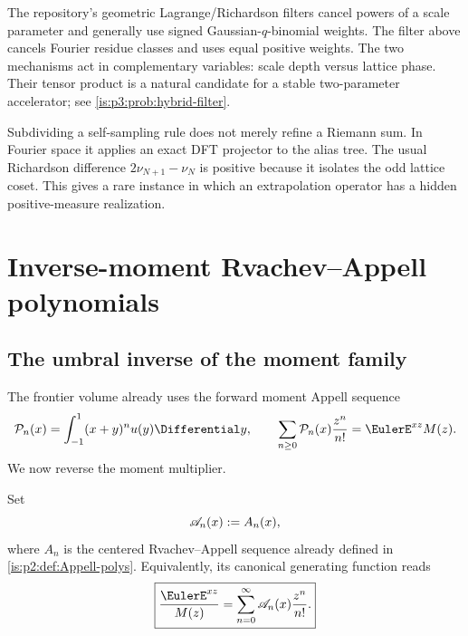 \begin{remark}
The repository's geometric Lagrange/Richardson filters cancel powers of a scale parameter and generally use signed Gaussian-$q$-binomial weights.  The filter above cancels Fourier residue classes and uses equal positive weights.  The two mechanisms act in complementary variables: scale depth versus lattice phase.  Their tensor product is a natural candidate for a stable two-parameter accelerator; see \cref{is:p3:prob:hybrid-filter}.
\end{remark}

\begin{resultbox}
Subdividing a self-sampling rule does not merely refine a Riemann sum.  In Fourier space it applies an exact DFT projector to the alias tree.  The usual Richardson difference $2\nu_{N+1}-\nu_N$ is positive because it isolates the odd lattice coset.  This gives a rare instance in which an extrapolation operator has a hidden positive-measure realization.
\end{resultbox}

\section{Inverse-moment Rvachev--Appell polynomials}
\label{is:p3:sec:appell}

\subsection{The umbral inverse of the moment family}

The frontier volume already uses the forward moment Appell sequence
\begin{equation}
 \Pcal_n(x)=\int_{-1}^{1}(x+y)^n u(y)\Differential y,
 \qquad
 \sum_{n\ge0}\Pcal_n(x)\frac{z^n}{n!}=\EulerE^{xz}M(z).
 \label{is:p3:eq:forward-Appell}
\end{equation}
We now reverse the moment multiplier.

\begin{definition}
\label{is:p3:def:inverse-Appell}
Set
\[
 \mathscr A_n(x):=A_n(x),
\]
where $A_n$ is the centered Rvachev--Appell sequence already defined in
\cref{is:p2:def:Appell-polys}.  Equivalently, its canonical generating
function reads
\begin{equation}
 \boxed{\displaystyle
 \frac{\EulerE^{xz}}{M(z)}
 =\sum_{n=0}^{\infty}\Acal_n(x)\frac{z^n}{n!}.}
 \label{is:p3:eq:inverse-Appell-gen}
\end{equation}
\end{definition}

